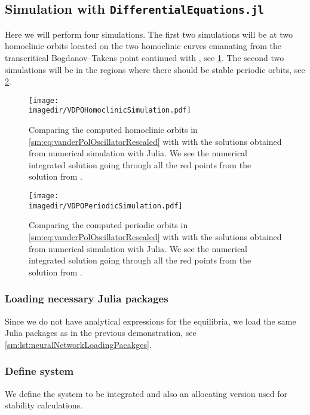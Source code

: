 \subsection{Simulation with {\tt DifferentialEquations.jl}}
Here we will perform four simulations. The first two simulations will be at two
homoclinic orbits located on the two homoclinic curves emanating from the
transcritical Bogdanov--Takens point continued with \DDEBIFTOOL, see
\cref{sm:fig:VDPOSimulationHomoclinic}. The second two simulations will be in
the regions where there should be stable periodic orbits, see
\cref{sm:fig:VDPOPeriodicSimulation}.

\begin{figure}[ht]
    \centering
    \texttt{[image: \\imagedir/VDPOHomoclinicSimulation.pdf]}
    \caption{Comparing the computed homoclinic orbits in \cref{sm:eq:vanderPolOscillatorRescaled}
    with \DDEBIFTOOL with the solutions obtained from numerical simulation with Julia.
    We see the numerical integrated solution
    going through all the red points from the solution from \DDEBIFTOOL.}
    \label{sm:fig:VDPOSimulationHomoclinic}
\end{figure}

\begin{figure}[ht]
    \centering
    \texttt{[image: \\imagedir/VDPOPeriodicSimulation.pdf]}
    \caption{Comparing the computed periodic orbits in \cref{sm:eq:vanderPolOscillatorRescaled}
    with \DDEBIFTOOL with the solutions obtained from numerical simulation with Julia.
    We see the numerical integrated solution
    going through all the red points from the solution from \DDEBIFTOOL.}
    \label{sm:fig:VDPOPeriodicSimulation}
\end{figure}

\subsubsection{Loading necessary Julia packages}
Since we do not have  analytical expressions for the equilibria, we load the
same Julia packages as in the previous demonstration, see
\cref{sm:lst:neuralNetworkLoadingPacakges}.

\subsubsection{Define system}
We define the system to be integrated and also an allocating version used for
stability calculations.
\inputminted[firstline=8, lastline=30]{julia}{\pathToJuliaFiles/vdpo_simulation_article.jl}

